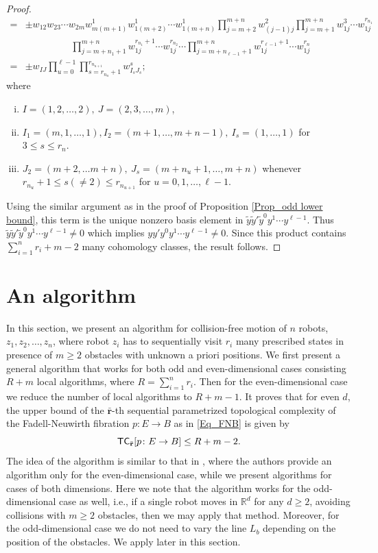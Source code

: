 \documentclass[12pt,oneside,reqno]{amsart}
\theoremstyle{plain}
\theoremstyle{definition}
\theoremstyle{remark}
\newcommand{\TC}{{\sf {TC}}}
\newcommand{\rr}{{\mathbb {R}}}
\newcommand{\br}{\bar{\mathbf{r}}}
\begin{document}
\begin{proof}
\begin{align*}
= &\pm w_{12} w_{23} \cdots w_{2m} w^1_{m(m+1)} w^1_{1(m+2)}\cdots w^1_{1(m+n)} \prod^{m+n}_{j=m+2} w^2_{(j-1)j}  \prod^{m+n}_{j=m+1} w^3_{1j}\cdots w^{r_{n_1}}_{1j}\\
&\hspace{2cm} \prod^{m+n}_{j=m+ n_1 +1} w^{r_{n_1}+1}_{1j} \cdots w^{r_{n_2}}_{1j} \cdots \prod^{m+n}_{j=m+n_{\ell-1}+1} w^{r_{\ell-1}+1}_{1j}\cdots w^{r_n}_{1j}\\
= & \pm w_{IJ} \prod^{\ell-1}_{u=0} \prod^{r_{n_{u+1}}}_{s = r_{n_{u}}+1} w^s_{I_sJ_s};
\end{align*}
where 
\begin{enumerate}[(i)]
\item $I= (1,2,\ldots,2), ~J=(2,3,\ldots,m)$,
\item  $I_1=(m,1, \ldots,1), I_2 = (m+1, \ldots, m+n-1), ~I_s = (1,\ldots,1)$ for $3\leq s\leq r_n$. 
\item $J_2 =(m+2, \ldots m+n),~J_s = (m + n_u + 1, \ldots, m + n)$ whenever $r_{n_u}+1\leq s(\neq 2)\leq r_{n_{u+1}}$ for $u = 0,1,\ldots, \ell-1$. 
\end{enumerate}
Using the similar argument as in the proof of Proposition \ref{Prop_odd lower bound}, this term is the unique nonzero basis element in $\tilde{y}\tilde{y}' \tilde{y}^0 y^1 \cdots y^{\ell-1}$. Thus $\tilde{y}\tilde{y}' \tilde{y}^0 y^1 \cdots y^{\ell-1} \neq 0$ which implies $y y' y^0 y^1\cdots y^{\ell-1} \neq 0$. Since this product contains $\sum^{n}_{i=1} {r_i} + m -2$ many cohomology classes, the result follows.
\end{proof}




\section{An algorithm}\label{sec:algorithm}
In this section, we present an algorithm for collision-free motion of $n$ robots, $z_1, z_2, \dots, z_n$, where robot $z_i$ has to sequentially visit $r_i$ many prescribed states in presence of $m\geq 2$ obstacles with unknown a priori positions.
We first present a general algorithm that works for both odd and even-dimensional cases consisting $R + m$ local algorithms, where $R=\sum^{n}_{i=1} {r_i}$. Then for the even-dimensional case we reduce the number of local algorithms to $R + m -1$. It proves that for even $d$, the upper bound of the $\bar{\textbf{r}}$-th sequential parametrized topological complexity of the Fadell-Neuwirth fibration $p\colon E\to B$ as in \eqref{Eq_FNB} is given by $$\TC_{\br}[p\colon E \to B] \leq R + m -2.$$
The idea of the algorithm is similar to that in \cite{FarP23}, where the authors provide an algorithm only for the even-dimensional case, while we present algorithms for cases of both dimensions. 
Here we note that the algorithm \cite[Section 2]{FarP23} works for the odd-dimensional case as well, i.e., if a single robot moves in $\rr^d$ for any $d\geq 2$, avoiding collisions with $m\geq 2$ obstacles, then we may apply that method. Moreover, for the odd-dimensional case we do not need to vary the line $L_b$ depending on the position of the obstacles. 
We apply \cite[Section 2]{FarP23} later in this section.
\end{document}
